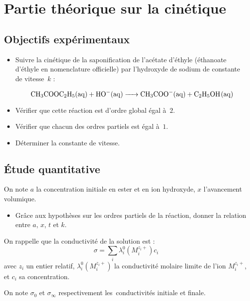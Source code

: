 \documentclass{tp}
\begin{document}
\section{Partie théorique sur la cinétique}

\subsection{Objectifs expérimentaux}

\begin{itemize}
\item Suivre la cinétique de la saponification de l'acétate d'éthyle (éthanoate d'éthyle en nomenclature officielle) par l'hydroxyde de sodium de constante de vitesse~$k$ :

\begin{equation}
  \ce{CH3COOC2H5(aq) + HO-(aq) -> CH3COO-(aq) + C2H5OH(aq)}
\end{equation}

\item Vérifier que cette réaction est d'ordre global égal à~$2$.
\item Vérifier que chacun des ordres partiels est égal à~$1$.
\item Déterminer la constante de vitesse.
\end{itemize}

\subsection{\'Etude quantitative}

 On note $a$ la concentration initiale en ester et en ion hydroxyde, $x$ l'avancement volumique.

\begin{itemize}

\item  Grâce aux hypothèses sur les ordres partiels de la réaction, donner la relation entre $a$, $x$, $t$ et $k$.

\end{itemize}

 On rappelle que la conductivité de la solution est : 
\begin{equation}
  \sigma = \sum_i \lambda_i^0(M_i^{z_i +})  c_i
\end{equation}
avec $z_i$ un entier relatif, $\lambda_i^0(M_i^{z_i +})$ la conductivité molaire limite de l'ion $M_i^{z_i +}$, et $c_i$ sa concentration.

\medskip

 On note $\sigma_0$ et $\sigma_{\infty}$ respectivement les~conductivités initiale et finale.
\end{document}
